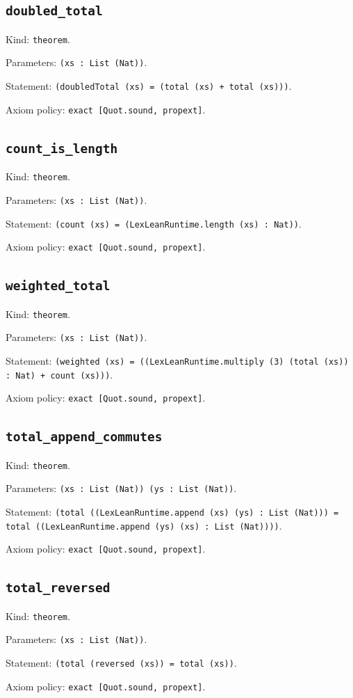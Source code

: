 \documentclass[11pt]{article}
\begin{document}
\subsection*{\texttt{doubled\_total}}
\noindent Kind: \texttt{theorem}.\par
\noindent Parameters: \texttt{(xs : List (Nat))}.\par
\noindent Statement: \texttt{(doubledTotal (xs) = (total (xs) + total (xs)))}.\par
\noindent Axiom policy: \texttt{exact [Quot.sound, propext]}.\par
\subsection*{\texttt{count\_is\_length}}
\noindent Kind: \texttt{theorem}.\par
\noindent Parameters: \texttt{(xs : List (Nat))}.\par
\noindent Statement: \texttt{(count (xs) = (LexLeanRuntime.length (xs) : Nat))}.\par
\noindent Axiom policy: \texttt{exact [Quot.sound, propext]}.\par
\subsection*{\texttt{weighted\_total}}
\noindent Kind: \texttt{theorem}.\par
\noindent Parameters: \texttt{(xs : List (Nat))}.\par
\noindent Statement: \texttt{(weighted (xs) = ((LexLeanRuntime.multiply (3) (total (xs)) : Nat) + count (xs)))}.\par
\noindent Axiom policy: \texttt{exact [Quot.sound, propext]}.\par
\subsection*{\texttt{total\_append\_commutes}}
\noindent Kind: \texttt{theorem}.\par
\noindent Parameters: \texttt{(xs : List (Nat)) (ys : List (Nat))}.\par
\noindent Statement: \texttt{(total ((LexLeanRuntime.append (xs) (ys) : List (Nat))) = total ((LexLeanRuntime.append (ys) (xs) : List (Nat))))}.\par
\noindent Axiom policy: \texttt{exact [Quot.sound, propext]}.\par
\subsection*{\texttt{total\_reversed}}
\noindent Kind: \texttt{theorem}.\par
\noindent Parameters: \texttt{(xs : List (Nat))}.\par
\noindent Statement: \texttt{(total (reversed (xs)) = total (xs))}.\par
\noindent Axiom policy: \texttt{exact [Quot.sound, propext]}.\par
\end{document}
